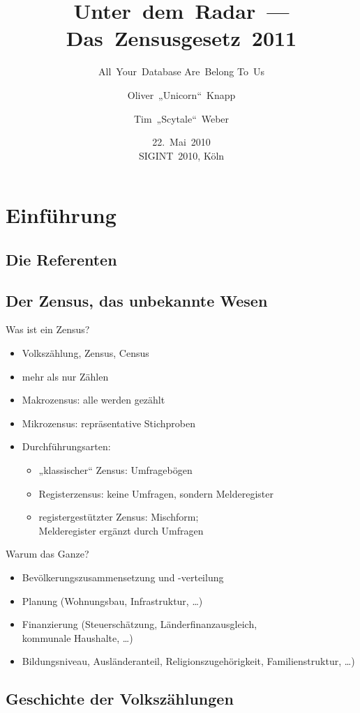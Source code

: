 \documentclass[ignorenonframetext,ucs]{beamer}
\title{Unter~dem~Radar~— Das~Zensusgesetz~2011}
\subtitle{All~Your~Database Are~Belong To~Us}
\author{Oliver~„Unicorn“~Knapp \and Tim~„Scytale“~Weber}
\institute{
	Chaos~Computer~Club~e.V. %
}
\date{22.~Mai~2010\\SIGINT~2010, Köln}
\begin{document}
\frame{\titlepage}

\section{Einführung}

\subsection{Die Referenten}

\subsection{Der Zensus, das unbekannte Wesen}

\begin{frame}{Was ist ein Zensus?}\begin{itemize}
\item Volkszählung, Zensus, Census
\item mehr als nur Zählen
\item Makrozensus: alle werden gezählt
\item Mikrozensus: repräsentative Stichproben
\item Durchführungsarten:\begin{itemize}
	\item „klassischer“ Zensus: Umfragebögen
	\item Registerzensus: keine Umfragen, sondern Melderegister
	\item registergestützter Zensus: Mischform;\\Melderegister ergänzt durch Umfragen
\end{itemize}
\end{itemize}\end{frame}

\begin{frame}{Warum das Ganze?}\begin{itemize}
\item Bevölkerungszusammensetzung und -verteilung
\item Planung (Wohnungsbau, Infrastruktur, …)
\item Finanzierung (Steuerschätzung, Länderfinanzausgleich,\\kommunale Haushalte, …)
\item Bildungsniveau, Ausländeranteil, Religionszugehörigkeit, Familienstruktur, …)
\end{itemize}\end{frame}

\subsection{Geschichte der Volkszählungen}
\end{document}
